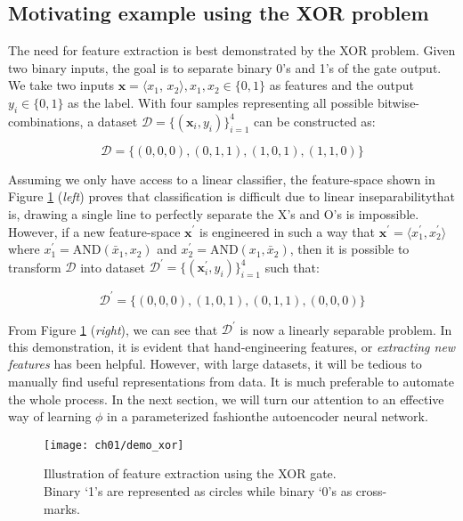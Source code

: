 \subsection{Motivating example using the XOR problem}

\par The need for feature extraction is best demonstrated by the XOR problem.
Given two binary inputs, the goal is to separate binary 0's and 1's of the gate
output. We take two inputs $\mathbf{x} = \langle x_{1}$, $x_{2} \rangle, x_1,
x_2 \in \{0,1\}$ as features and the output $y_{i} \in \{0,1\}$ as the label.
With four samples representing all possible bitwise-combinations, a dataset
$\mathcal{D}=\{(\mathbf{x}_{i}, y_{i})\}_{i=1}^{4}$ can be constructed as:

\[
    \mathcal{D} = \{(0,0,0), (0,1,1), (1,0,1), (1,1,0)\}
\]

Assuming we only have access to a linear classifier, the feature-space shown in
Figure \ref{demo:xor} (\textit{left}) proves that classification is difficult
due to linear inseparability\textemdash that is, drawing a single line to
perfectly separate the X's and O's is impossible.  However, if a new
feature-space $\mathbf{x}^{\prime}$ is engineered in such a way that
$\mathbf{x}^{\prime} = \langle {x}^{\prime}_{1}, {x}^{\prime}_2 \rangle$ where
$x^{\prime}_{1} = \text{AND}(\bar{x}_{1}, x_{2})$ and $x^{\prime}_{2} =
\text{AND}(x_{1}, \bar{x}_{2})$, then it is possible to transform $\mathcal{D}$
into dataset $\mathcal{D}^{\prime}=\{(\mathbf{x}^{\prime}_{i},
y_{i})\}_{i=1}^{4}$ such that:

\[
    \mathcal{D}^{\prime} = \{(0,0,0), (1,0,1), (0,1,1), (0,0,0)\}
\]

\par From Figure \ref{demo:xor} (\textit{right}), we can see that
$\mathcal{D}^{\prime}$ is now a linearly separable problem. In this
demonstration, it is evident that hand-engineering features, or
\textit{extracting new features} has been helpful. However, with large
datasets, it will be tedious to manually find useful representations from data.
It is much preferable to automate the whole process. In the next section, we
will turn our attention to an effective way of learning $\phi$ in a
parameterized fashion\textemdash the autoencoder neural network.

\begin{figure}[!t]
  \centering
  \texttt{[image: ch01/demo\_xor]}
  \caption[Illustration of feature extraction using the XOR gate]
    {Illustration of feature extraction using the XOR gate.\\ Binary `1's are
    represented as circles while binary `0's as cross-marks.}
  \label{demo:xor}
\end{figure}


